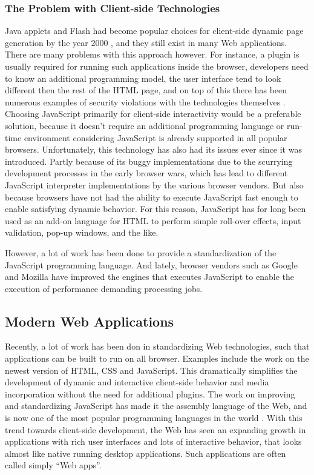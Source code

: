 \subsubsection{The Problem with Client-side Technologies}
Java applets and Flash had become popular choices for client-side dynamic page generation by the year 2000 \cite[p.2-3]{spa}, and they still exist in many Web applications. There are many problems with this approach however. For instance, a plugin is usually required for running such applications inside the browser, developers need to know an additional programming model, the user interface tend to look different then the rest of the HTML page, and on top of this there has been numerous examples of security violations with the technologies themselves \cite[p.875-877]{tanumbaum}. Choosing JavaScript primarily for client-side interactivity would be a preferable solution, because it doesn't require an additional programming language or run-time environment considering JavaScript is already supported in all popular browsers. Unfortunately, this technology has also had its issues ever since it was introduced. Partly because of its buggy implementations due to the scurrying development processes in the early browser wars, which has lead to different JavaScript interpreter implementations by the various browser vendors. But also because browsers have not had the ability to execute JavaScript fast enough to enable satisfying dynamic behavior. For this reason, JavaScript has for long been used as an add-on language for HTML to perform simple roll-over effects, input validation, pop-up windows, and the like.  

However, a lot of work has been done to provide a standardization of the JavaScript programming language. And lately, browser vendors such as Google\cite{google} and Mozilla\cite{mozilla} have improved the engines that executes JavaScript to enable the execution of performance demanding processing jobs. 

\subsection{Modern Web Applications}
Recently, a lot of work has been don in standardizing Web technologies, such that applications can be built to run on all browser. Examples include the work on the newest version of HTML, CSS and JavaScript. This dramatically simplifies the development of dynamic and interactive client-side behavior and media incorporation without the need for additional plugins. The work on improving  and standardizing JavaScript has made it the assembly language of the Web, and is now one of the most popular programming languages in the world \cite{jsPopularity}. With this trend towards client-side development, the Web has seen an expanding growth in applications with rich user interfaces and lots of interactive behavior, that looks almost like native running desktop applications. Such applications are often called simply ``Web apps''.

